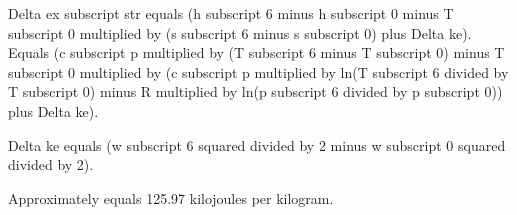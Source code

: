 Delta ex subscript str equals (h subscript 6 minus h subscript 0 minus T subscript 0 multiplied by (s subscript 6 minus s subscript 0) plus Delta ke).  
Equals (c subscript p multiplied by (T subscript 6 minus T subscript 0) minus T subscript 0 multiplied by (c subscript p multiplied by ln(T subscript 6 divided by T subscript 0) minus R multiplied by ln(p subscript 6 divided by p subscript 0)) plus Delta ke).  

Delta ke equals (w subscript 6 squared divided by 2 minus w subscript 0 squared divided by 2).  

Approximately equals 125.97 kilojoules per kilogram.